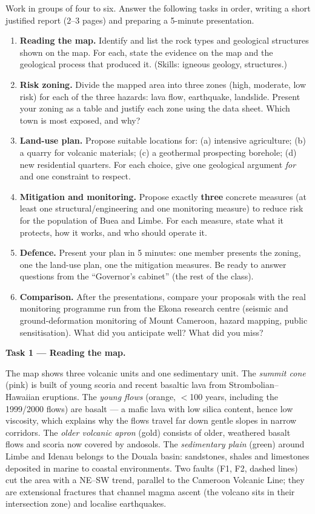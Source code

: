 \documentclass[11pt]{article}
\newcommand{\cle}[1]{{\popxbold\color{popdark}#1}}
\newcounter{popsec}
\newcounter{popsub}
\newcommand{\courssub}[1]{%
  \stepcounter{popsub}%
  \par\vspace{9pt}\noindent{\popxbold\fontsize{11.5}{13}\selectfont\color{popink}{\color{poporange}\thepopsec.\thepopsub}\hspace{6pt}#1}\par\nopagebreak\vspace{4pt}
}
\begin{document}
\courssub{Tasks}

Work in groups of four to six. Answer the following tasks in order, writing a short justified report (2--3 pages) and preparing a 5-minute presentation.

\begin{enumerate}
\item \textbf{Reading the map.} Identify and list the rock types and geological structures shown on the map. For each, state the evidence on the map and the geological process that produced it. (Skills: igneous geology, structures.)
\item \textbf{Risk zoning.} Divide the mapped area into three zones (high, moderate, low risk) for each of the three hazards: lava flow, earthquake, landslide. Present your zoning as a table and justify each zone using the data sheet. Which town is most exposed, and why?
\item \textbf{Land-use plan.} Propose suitable locations for: (a) intensive agriculture; (b) a quarry for volcanic materials; (c) a geothermal prospecting borehole; (d) new residential quarters. For each choice, give one geological argument \emph{for} and one constraint to respect.
\item \textbf{Mitigation and monitoring.} Propose exactly \textbf{three} concrete measures (at least one structural/engineering and one monitoring measure) to reduce risk for the population of Buea and Limbe. For each measure, state what it protects, how it works, and who should operate it.
\item \textbf{Defence.} Present your plan in 5 minutes: one member presents the zoning, one the land-use plan, one the mitigation measures. Be ready to answer questions from the ``Governor's cabinet'' (the rest of the class).
\item \textbf{Comparison.} After the presentations, compare your proposals with the real monitoring programme run from the Ekona research centre (seismic and ground-deformation monitoring of Mount Cameroon, hazard mapping, public sensitisation). What did you anticipate well? What did you miss?
\end{enumerate}

\courssub{Model answer}

\textbf{Task 1 — Reading the map.}\par
The map shows three volcanic units and one sedimentary unit. The \emph{summit cone} (pink) is built of young scoria and recent basaltic lava from Strombolian--Hawaiian eruptions. The \emph{young flows} (orange, $<$100 years, including the 1999/2000 flows) are \cle{basalt} — a mafic lava with low silica content, hence low viscosity, which explains why the flows travel far down gentle slopes in narrow corridors. The \emph{older volcanic apron} (gold) consists of older, weathered basalt flows and scoria now covered by andosols. The \emph{sedimentary plain} (green) around Limbe and Idenau belongs to the Douala basin: sandstones, shales and limestones deposited in marine to coastal environments. Two \cle{faults} (F1, F2, dashed lines) cut the area with a NE--SW trend, parallel to the Cameroon Volcanic Line; they are extensional fractures that channel magma ascent (the volcano sits in their intersection zone) and localise earthquakes.
\end{document}
